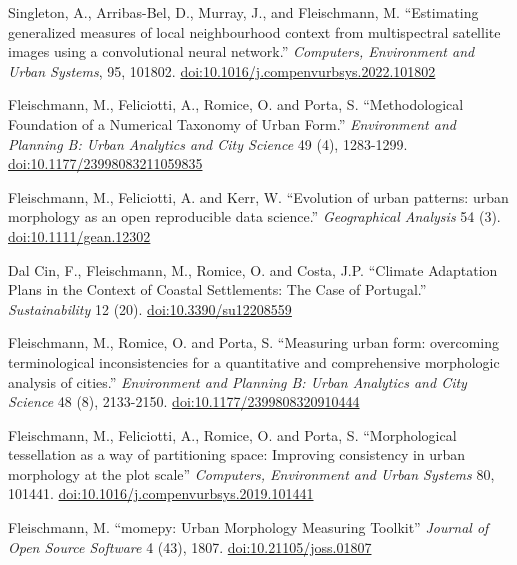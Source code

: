 \documentclass[12pt,a4paper]{report}
\begin{document}
\begin{tablist}
        \item[2022] \tab{}Singleton, A., Arribas-Bel, D., Murray, J., and Fleischmann, M. \enquote{Estimating generalized measures of local neighbourhood context from multispectral satellite images using a convolutional neural network.} \textit{Computers, Environment and Urban Systems}, 95, 101802. \href{https://doi.org/10.1016/j.compenvurbsys.2022.101802}{doi:10.1016/j.compenvurbsys.2022.101802}

        \item[2021] \tab{}Fleischmann, M., Feliciotti, A., Romice, O. and Porta, S. \enquote{Methodological Foundation of a Numerical Taxonomy of Urban Form.} \textit{Environment and Planning B: Urban Analytics and City Science} 49 (4), 1283-1299. \href{https://doi.org/10.1177/23998083211059835}{doi:10.1177/23998083211059835}

        \item[2021] \tab{}Fleischmann, M., Feliciotti, A. and Kerr, W. \enquote{Evolution of urban patterns: urban morphology as an open reproducible data science.} \textit{Geographical Analysis} 54 (3). \href{https://doi.org/10.1111/gean.12302}{doi:10.1111/gean.12302}

        \item[2020] \tab{}Dal Cin, F., Fleischmann, M., Romice, O. and Costa, J.P. \enquote{Climate Adaptation Plans in the Context of Coastal Settlements: The Case of Portugal.} \textit{Sustainability} 12 (20). \href{https://doi.org/10.3390/su12208559}{doi:10.3390/su12208559}

        \item[2020] \tab{}Fleischmann, M., Romice, O. and Porta, S. \enquote{Measuring urban form: overcoming terminological inconsistencies for a quantitative and comprehensive morphologic analysis of cities.} \textit{Environment and Planning B: Urban Analytics and City Science} 48 (8), 2133-2150. \href{https://doi.org/10.1177/2399808320910444}{doi:10.1177/2399808320910444}

        \item[2020] \tab{}Fleischmann, M., Feliciotti, A., Romice, O. and Porta, S. \enquote{Morphological tessellation as a way of partitioning space: Improving consistency in urban morphology at the plot scale} \textit{Computers, Environment and Urban Systems} 80, 101441. \href{https://doi.org/10.1016/j.compenvurbsys.2019.101441}{doi:10.1016/j.compenvurbsys.2019.101441}

        \item[2019] \tab{}Fleischmann, M. \enquote{momepy: Urban Morphology Measuring Toolkit} \textit{Journal of Open Source Software} 4 (43), 1807. \href{https://doi.org/10.21105/joss.01807}{doi:10.21105/joss.01807}


    \end{tablist}
\end{document}
